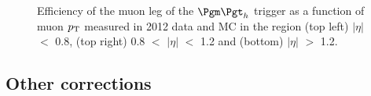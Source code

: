 \begin{figure}[htb]

\begin{center}
\end{center}
\caption{Efficiency of the muon leg of the $\mutau$ trigger as a function of muon $p_{\mathrm{T}}$ measured in
2012 data and MC in the region (top left) $|\eta|$ $<$ 0.8, (top right) 0.8
$<$ $|\eta|$ $<$ 1.2 and (bottom) $|\eta|$ $>$ 1.2.}
\label{fig:muontrg}
\end{figure}

\subsection{Other corrections}

